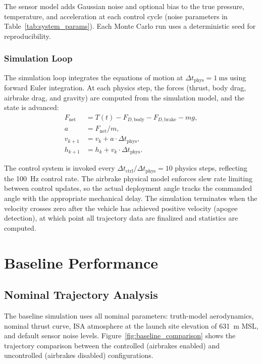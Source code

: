\documentclass[11pt,letterpaper]{article}
\begin{document}
The sensor model adds Gaussian noise and optional bias to the true pressure, temperature, and acceleration at each control cycle (noise parameters in Table~\ref{tab:system_params}). Each Monte Carlo run uses a deterministic seed for reproducibility.

\subsubsection{Simulation Loop}
\label{sec:sim_loop}

The simulation loop integrates the equations of motion at $\Delta t_{\mathrm{phys}} = \SI{1}{\milli\second}$ using forward Euler integration. At each physics step, the forces (thrust, body drag, airbrake drag, and gravity) are computed from the simulation model, and the state is advanced:
\begin{align}
    F_{\mathrm{net}} &= T(t) - F_{D,\mathrm{body}} - F_{D,\mathrm{brake}} - m g, \label{eq:net_force} \\
    a &= F_{\mathrm{net}} / m, \label{eq:accel} \\
    v_{k+1} &= v_k + a \cdot \Delta t_{\mathrm{phys}}, \label{eq:vel_update} \\
    h_{k+1} &= h_k + v_k \cdot \Delta t_{\mathrm{phys}}. \label{eq:alt_update}
\end{align}

The control system is invoked every $\Delta t_{\mathrm{ctrl}} / \Delta t_{\mathrm{phys}} = 10$ physics steps, reflecting the 100~Hz control rate. The airbrake physical model enforces slew rate limiting between control updates, so the actual deployment angle tracks the commanded angle with the appropriate mechanical delay. The simulation terminates when the velocity crosses zero after the vehicle has achieved positive velocity (apogee detection), at which point all trajectory data are finalized and statistics are computed.


\section{Baseline Performance}
\label{sec:baseline}

\subsection{Nominal Trajectory Analysis}
\label{sec:nominal_traj}

The baseline simulation uses all nominal parameters: truth-model aerodynamics, nominal thrust curve, ISA atmosphere at the launch site elevation of \SI{631}{\metre} MSL, and default sensor noise levels. Figure~\ref{fig:baseline_comparison} shows the trajectory comparison between the controlled (airbrakes enabled) and uncontrolled (airbrakes disabled) configurations.
\end{document}
